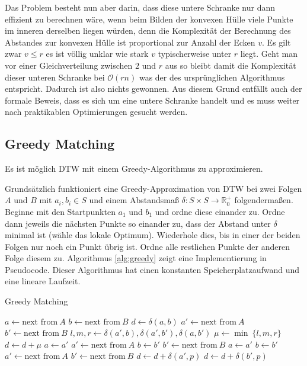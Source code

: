 Das Problem besteht nun aber darin, dass diese untere Schranke nur dann effizient zu berechnen wäre, wenn beim Bilden der konvexen Hülle viele Punkte im inneren derselben liegen würden, denn die Komplexität der Berechnung des Abstandes zur konvexen Hülle ist proportional zur Anzahl der Ecken $v$. Es gilt zwar $v \leq r$ es ist völlig unklar wie stark $v$ typischerweise unter $r$ liegt. Geht man vor einer Gleichverteilung zwischen $2$ und $r$ aus so bleibt damit die Komplexität dieser unteren Schranke bei \( \mathcal{O}(rn) \) was der des ursprünglichen Algorithmus entspricht. Dadurch ist also nichts gewonnen. Aus diesem Grund entfällt auch der formale Beweis, dass es sich um eine untere Schranke handelt und es muss weiter nach praktikablen Optimierungen gesucht werden.

\subsection{Greedy Matching} %
\label{sub:greedy}

Es ist möglich DTW mit einem Greedy-Algorithmus \cite[S.370ff.]{algorithms} zu approximieren.

Grundsätzlich funktioniert eine Greedy-Approximation von DTW bei zwei Folgen $A$ und $B$ mit \(a_i,b_i \in S\) und einem Abstandsmaß \(\delta:S\times S \rightarrow \mathbb{R}_0^+\) folgendermaßen. Beginne mit den Startpunkten $a_1$ und $b_1$ und ordne diese einander zu. Ordne dann jeweils die nächsten Punkte so einander zu, dass der Abstand unter \(\delta\) minimal ist (wähle das lokale Optimum). Wiederhole dies, bis in einer der beiden Folgen nur noch ein Punkt übrig ist. Ordne alle restlichen Punkte der anderen Folge diesem zu. Algorithmus \ref{alg:greedy} zeigt eine Implementierung in Pseudocode.
Dieser Algorithmus hat einen konstanten Speicherplatzaufwand und eine lineare Laufzeit.

\begin{algorithm}
  \caption{Greedy Matching}
  \label{alg:greedy}
  \begin{algorithmic}
    \STATE $a \gets \text{next from}~A$
    \STATE $b \gets \text{next from}~B$
    \STATE $d \gets \delta(a,b)$
    \STATE $a' \gets \text{next from}~A$
    \STATE $b' \gets \text{next from}~B$
      \STATE $l, m, r \gets \delta(a',b), \delta(a', b'), \delta(a, b')$
      \STATE $\mu \gets \min ~\{l, m, r\}$
      \STATE $d \gets d + \mu$
        \STATE $a \gets a'$
        \STATE $a' \gets \text{next from}~A$
        \STATE $b \gets b'$
        \STATE $b' \gets \text{next from}~B$
      \ELSE
        \STATE $a \gets a'$
        \STATE $b \gets b'$
        \STATE $a' \gets \text{next from}~A$
        \STATE $b' \gets \text{next from}~B$
      \ENDIF
    \ENDWHILE
        \STATE $d \gets d + \delta(a',p)$
      \ENDFOR
        \STATE $d \gets d + \delta(b',p)$
      \ENDFOR
    \ENDIF
  \end{algorithmic}
\end{algorithm}

